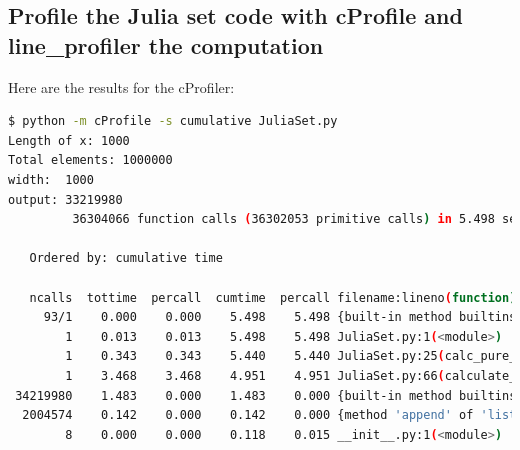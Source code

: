 \documentclass[a4paper,12pt]{article}
\begin{document}
\subsection{Profile the Julia set code with cProfile and line\_profiler the computation}

Here are the results for the cProfiler:
\begin{lstlisting}[language=bash,basicstyle=\scriptsize\ttfamily]
$ python -m cProfile -s cumulative JuliaSet.py
Length of x: 1000
Total elements: 1000000
width:	1000
output:	33219980
         36304066 function calls (36302053 primitive calls) in 5.498 seconds

   Ordered by: cumulative time

   ncalls  tottime  percall  cumtime  percall filename:lineno(function)
     93/1    0.000    0.000    5.498    5.498 {built-in method builtins.exec}
        1    0.013    0.013    5.498    5.498 JuliaSet.py:1(<module>)
        1    0.343    0.343    5.440    5.440 JuliaSet.py:25(calc_pure_python)
        1    3.468    3.468    4.951    4.951 JuliaSet.py:66(calculate_z_serial_purepython)
 34219980    1.483    0.000    1.483    0.000 {built-in method builtins.abs}
  2004574    0.142    0.000    0.142    0.000 {method 'append' of 'list' objects}
        8    0.000    0.000    0.118    0.015 __init__.py:1(<module>)
\end{lstlisting}
\end{document}
